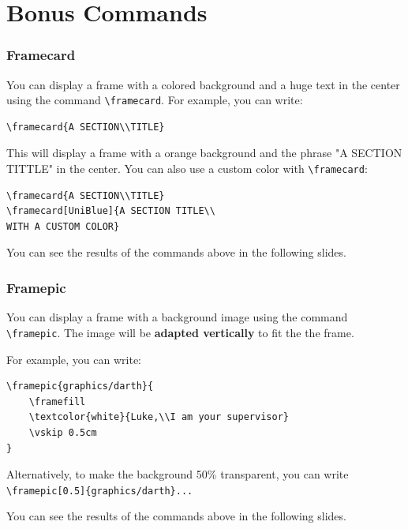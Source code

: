 \documentclass{article}
\begin{document}
\section{Bonus Commands}

\begin{frame}[fragile]
\frametitle{Framecard}

You can display a frame with a colored background and a huge text in the center using the command \texttt{\textbackslash framecard}.
\vskip 0.5cm 
For example, you can write:
\begin{verbatim}
\framecard{A SECTION\\TITLE}
\end{verbatim}

This will display a frame with a orange background and the phrase "A SECTION TITTLE" in the center. You can also use a custom color with \texttt{\textbackslash framecard}:
\begin{verbatim}
\framecard{A SECTION\\TITLE}
\framecard[UniBlue]{A SECTION TITLE\\
WITH A CUSTOM COLOR}
\end{verbatim}
You can see the results of the commands above in the following slides.

\end{frame}


\begin{frame}[fragile]
\frametitle{Framepic}

You can display a frame with a background image using the command \texttt{\textbackslash framepic}. The image will be \textbf{adapted vertically} to fit the the frame. 

For example, you can write:
\begin{verbatim}
\framepic{graphics/darth}{
	\framefill
    \textcolor{white}{Luke,\\I am your supervisor}
    \vskip 0.5cm
}
\end{verbatim}

Alternatively, to make the background 50\% transparent, you can write \texttt{\textbackslash framepic[0.5]\{graphics/darth\}...}


You can see the results of the commands above in the following slides.

\end{frame}
\end{document}
